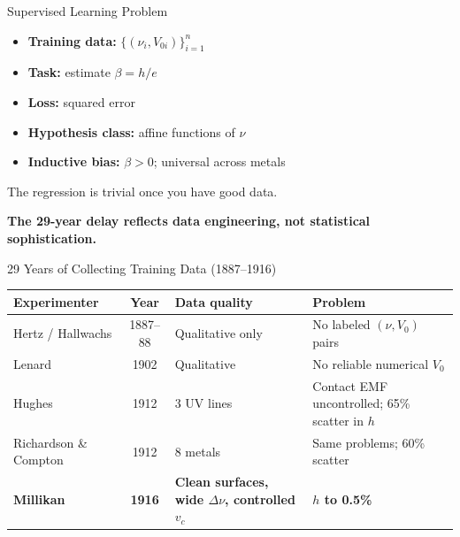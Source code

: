 \documentclass[aspectratio=169]{beamer}
\begin{document}
\begin{frame}{Supervised Learning Problem}

\begin{itemize}
  \item \textbf{Training data:} $\{(\nu_i, V_{0i})\}_{i=1}^n$
  \item \textbf{Task:} estimate $\beta = h/e$
  \item \textbf{Loss:} squared error
  \item \textbf{Hypothesis class:} affine functions of $\nu$
  \item \textbf{Inductive bias:} $\beta > 0$; universal across metals
\end{itemize}

\bigskip
The regression is trivial once you have good data.

\bigskip
\textbf{The 29-year delay reflects data engineering, not statistical
sophistication.}

\end{frame}

\begin{frame}{29 Years of Collecting Training Data (1887--1916)}

\begin{center}
\small
\begin{tabular}{p{3.2cm}cp{3.5cm}p{4.3cm}}
\toprule
Experimenter & Year & Data quality & Problem \\
\midrule
Hertz / Hallwachs & 1887--88 & Qualitative only & No labeled $(\nu,V_0)$ pairs \\
Lenard            & 1902     & Qualitative       & No reliable numerical $V_0$ \\
Hughes            & 1912     & 3 UV lines        & Contact EMF uncontrolled; 65\% scatter in $h$ \\
Richardson \& Compton & 1912 & 8 metals          & Same problems; 60\% scatter \\
\midrule
\textbf{Millikan} & \textbf{1916} &
  \textbf{Clean surfaces, wide $\Delta\nu$, controlled $v_c$} &
  \textbf{$h$ to 0.5\%} \\
\bottomrule
\end{tabular}
\end{center}

\end{frame}
\end{document}
